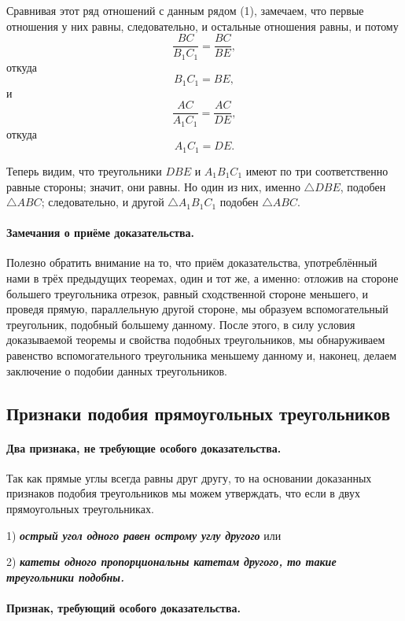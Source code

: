 \documentclass[oneside]{book}
\begin{document}
Сравнивая этот ряд отношений с данным рядом (1), замечаем, что первые отношения у них равны, следовательно, и остальные отношения равны, и потому
\[\frac{BC}{B_1C_1}=\frac{BC}{BE},\]
откуда
\[B_1C_1=BE,\]
и
\[\frac{AC}{A_1C_1}=\frac{AC}{DE},\]
откуда
\[A_1C_1=DE.\]

Теперь видим, что треугольники $DBE$ и $A_1B_1C_1$ имеют по три соответственно равные стороны;
значит, они равны.
Но один из них, именно $\triangle DBE$, подобен $\triangle ABC$;
следовательно, и другой $\triangle A_1B_1C_1$ подобен $\triangle ABC$.

\paragraph{Замечания о приёме доказательства.}\label{1938/162}
Полезно обратить внимание на то, что приём доказательства, употреблённый нами в трёх предыдущих теоремах, один и тот же, а именно:
отложив на стороне большего треугольника отрезок, равный сходственной стороне меньшего, и проведя прямую, параллельную другой стороне, мы образуем вспомогательный треугольник, подобный большему данному.
После этого, в силу условия доказываемой теоремы и свойства подобных треугольников, мы обнаруживаем равенство вспомогательного треугольника меньшему данному и, наконец, делаем заключение о подобии данных треугольников.

\subsection*{Признаки подобия прямоугольных треугольников}

\paragraph{Два признака, не требующие особого доказательства.}\label{1938/163}

Так как прямые углы всегда равны друг другу, то на основании доказанных признаков подобия треугольников мы можем утверждать, что если в двух прямоугольных треугольниках.

1) \textbf{\emph{острый угол одного равен острому углу другого}} или

2) \textbf{\emph{катеты одного пропорциональны катетам другого, то такие треугольники подобны.}}


\paragraph{Признак, требующий особого доказательства.}\label{1938/164}
\end{document}
